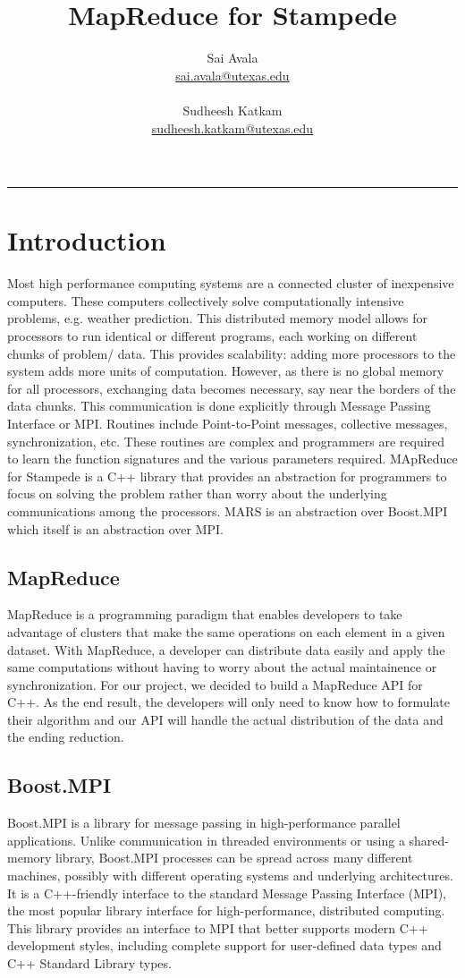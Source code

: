 \documentclass[11pt]{article}
\title{MapReduce for Stampede}
\author{
  Sai Avala\\ 
  \href{mailto:sai.avala@utexas.edu}
          {sai.avala@utexas.edu}  \\ \\
  Sudheesh Katkam \\
  \href{mailto:sudheesh.katkam@utexas.edu}
          {sudheesh.katkam@utexas.edu}  }
\begin{document}
\maketitle
\newpage
\rule{6.0in}{.001in}
\tableofcontents
\newpage

\section{Introduction}
Most high performance computing systems are a connected cluster of inexpensive computers. These computers collectively solve computationally intensive problems, e.g. weather prediction. This distributed memory model allows for processors to run identical or different programs, each working on different chunks of problem/ data. This provides scalability: adding more processors to the system adds more units of computation. However, as there is no global memory for all processors, exchanging data becomes necessary, say near the borders of the data chunks. This communication is done explicitly through Message Passing Interface or MPI. Routines include Point-to-Point messages, collective messages, synchronization, etc. These routines are complex and programmers are required to learn the function signatures and the various parameters required. MApReduce for Stampede is a C++ library that provides an abstraction for programmers to focus on solving the problem rather than worry about the underlying communications among the processors. MARS is an abstraction over Boost.MPI which itself is an abstraction over MPI.

\subsection{MapReduce}
MapReduce is a programming paradigm that enables developers to take advantage of clusters that make the same operations on each element in a given dataset. With MapReduce, a developer can distribute data easily and apply the same computations without having to worry about the actual maintainence or synchronization. For our project, we decided to build a MapReduce API for C++. As the end result, the developers will only need to know how to formulate their algorithm and our API will handle the actual distribution of the data and the ending reduction.

\subsection{Boost.MPI}
Boost.MPI is a library for message passing in high-performance parallel applications. Unlike communication in threaded environments or using a shared-memory library, Boost.MPI processes can be spread across many different machines, possibly with different operating systems and underlying architectures. It is a C++-friendly interface to the standard Message Passing Interface (MPI), the most popular library interface for high-performance, distributed computing. This library provides an interface to MPI that better supports modern C++ development styles, including complete support for user-defined data types and C++ Standard Library types.
\end{document}
